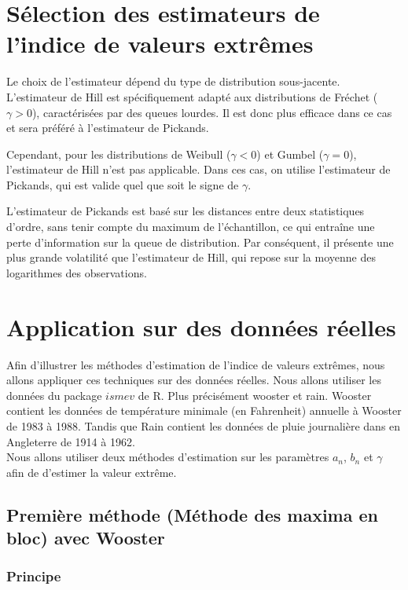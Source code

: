 \documentclass{article}
\begin{document}
\section{Sélection des estimateurs de l'indice de valeurs extrêmes}

Le choix de l’estimateur dépend du type de distribution sous-jacente. L’estimateur de Hill est spécifiquement adapté aux distributions de Fréchet (\(\gamma > 0\)), caractérisées par des queues lourdes. Il est donc plus efficace dans ce cas et sera préféré à l’estimateur de Pickands.  

Cependant, pour les distributions de Weibull (\(\gamma < 0\)) et Gumbel (\(\gamma = 0\)), l’estimateur de Hill n’est pas applicable. Dans ces cas, on utilise l’estimateur de Pickands, qui est valide quel que soit le signe de \( \gamma \).  

L'estimateur de Pickands est basé sur les distances entre deux statistiques d'ordre, sans tenir compte du maximum de l’échantillon, ce qui entraîne une perte d'information sur la queue de distribution. Par conséquent, il présente une plus grande volatilité que l'estimateur de Hill, qui repose sur la moyenne des logarithmes des observations.

\newpage
\section{Application sur des données réelles}

Afin d'illustrer les méthodes d'estimation de l'indice de valeurs extrêmes, nous allons appliquer ces techniques sur des données réelles.
Nous allons utiliser les données du package $ismev$ de R. Plus précisément wooster et rain. Wooster contient les données de température minimale (en Fahrenheit) annuelle à Wooster de 1983 à 1988.
Tandis que Rain contient les données de pluie journalière dans en Angleterre de 1914 à 1962.
\\
Nous allons utiliser deux méthodes d'estimation sur les paramètres $a_n$, $b_n$ et $\gamma$ afin de d'estimer la valeur extrême.

\subsection{Première méthode (Méthode des maxima en bloc) avec Wooster}
\subsubsection{Principe}
\end{document}
